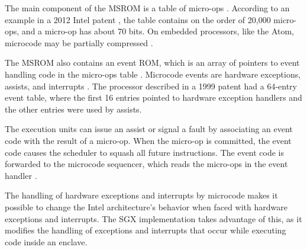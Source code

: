 The main component of the MSROM is a table of micro-ops \cite{intel2008genetic,
intel2012clusters}. According to an example in a 2012 Intel patent
\cite{intel2012clusters}, the table contains on the order of 20,000 micro-ops,
and a micro-op has about 70 bits. On embedded processors, like the Atom,
microcode may be partially compressed
\cite{intel2008genetic, intel2012clusters}.


The MSROM also contains an event ROM, which is an array of pointers to event
handling code in the micro-ops table \cite{intel1999events}. Microcode events
are hardware exceptions, assists, and interrupts \cite{intel1997events,
intel1999exceptions}. The processor described in a 1999 patent
\cite{intel1999events} had a 64-entry event table, where the first 16 entries
pointed to hardware exception handlers and the other entries were used by
assists.


The execution units can issue an assist or signal a fault by associating an
event code with the result of a micro-op. When the micro-op is committed, the
event code causes the scheduler to squash all future instructions. The event
code is forwarded to the microcode sequencer, which reads the micro-ops in the
event handler \cite{intel1997events, intel1999exceptions}.

The handling of hardware exceptions and interrupts by microcode makes it
possible to change the Intel architecture's behavior when faced with hardware
exceptions and interrupts. The SGX implementation takes advantage of this, as
it modifies the handling of exceptions and interrupts that occur while
executing code inside an enclave.


